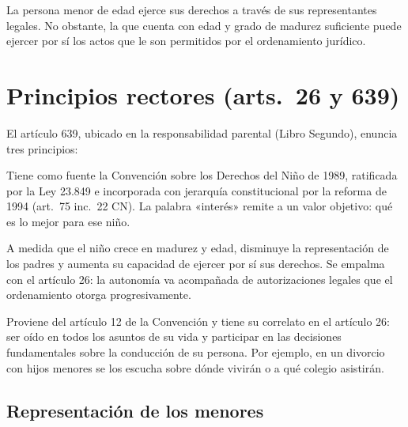 \documentclass[12pt,oneside]{book}
\begin{document}
\begin{regla}
La persona menor de edad ejerce sus derechos a través de sus representantes legales. No obstante, la que cuenta con edad y grado de madurez suficiente puede ejercer por sí los actos que le son permitidos por el ordenamiento jurídico.
\end{regla}

\section{Principios rectores (arts.~26 y 639)}

El artículo 639, ubicado en la responsabilidad parental (Libro Segundo), enuncia tres principios:

\begin{description}[leftmargin=0pt,style=unboxed]
\item[Interés superior del niño.] Tiene como fuente la Convención sobre los Derechos del Niño de 1989, ratificada por la Ley 23.849 e incorporada con jerarquía constitucional por la reforma de 1994 (art.~75 inc.~22 CN). La palabra «interés» remite a un valor objetivo: qué es lo mejor para ese niño.
\item[Autonomía progresiva.] A medida que el niño crece en madurez y edad, disminuye la representación de los padres y aumenta su capacidad de ejercer por sí sus derechos. Se empalma con el artículo 26: la autonomía va acompañada de autorizaciones legales que el ordenamiento otorga progresivamente.
\item[Derecho a ser oído.] Proviene del artículo 12 de la Convención y tiene su correlato en el artículo 26: ser oído en todos los asuntos de su vida y participar en las decisiones fundamentales sobre la conducción de su persona. Por ejemplo, en un divorcio con hijos menores se los escucha sobre dónde vivirán o a qué colegio asistirán.
\end{description}

\subsection{Representación de los menores}
\end{document}
